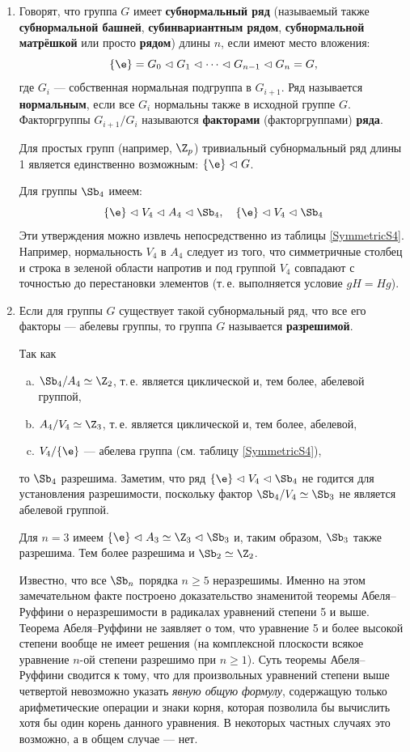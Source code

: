 \begin{enumerate}
\item Говорят, что группа $G$ имеет \textbf{субнормальный ряд} (называемый также \textbf{субнормальной башней}, \textbf{субинвариантным рядом}, \textbf{субнормальной матрёшкой} или просто \textbf{рядом}) длины $n$, если имеют место вложения:
$$
\{\e\}=G_0\vartriangleleft G_1\vartriangleleft\dots\vartriangleleft G_{n-1}\vartriangleleft G_n=G,
$$
где $G_i$ --- собственная нормальная подгруппа в $G_{i+1}$. Ряд называется \textbf{нормальным}, если все $G_i$ нормальны также в исходной группе $G$. Факторгруппы $G_{i+1}/G_i$ называются \textbf{факторами} (факторгруппами) \textbf{ряда}.

Для простых групп (например, $\Z_p$) тривиальный субнормальный ряд длины 1 является единственно возможным: $\{\e\}\vartriangleleft G$.

Для группы $\Sb_4$ имеем: 
$$
\{\e\}\vartriangleleft V_4\vartriangleleft A_4\vartriangleleft\Sb_4,\quad\{\e\}\vartriangleleft V_4\vartriangleleft\Sb_4
$$
Эти утверждения можно извлечь непосредственно из таблицы \ref{SymmetricS4}. Например, нормальность $V_4$ в $A_4$ следует из того, что симметричные столбец и строка в зеленой области напротив и под группой $V_4$ совпадают с точностью до перестановки элементов (т.\,е. выполняется условие $gH=Hg$).

\item Если для группы $G$ существует такой субнормальный ряд, что все его факторы --- абелевы группы, то группа $G$ называется \textbf{разрешимой}.

Так как
\begin{enumerate}[a)]
\item $\Sb_4/A_4\simeq\Z_2$, т.\,е. является циклической и, тем более, абелевой группой,
\item $A_4/V_4\simeq\Z_3$, т.\,е. является циклической и, тем более, абелевой,
\item $V_4/\{\e\}$ --- абелева группа (см. таблицу \ref{SymmetricS4}),
\end{enumerate}
то $\Sb_4$ разрешима. Заметим, что ряд $\{\e\}\vartriangleleft V_4\vartriangleleft\Sb_4$ не годится для установления разрешимости, поскольку фактор $\Sb_4/V_4\simeq\Sb_3$ не является абелевой группой.

Для $n=3$ имеем $\{\e\}\vartriangleleft A_3\simeq\Z_3\vartriangleleft\Sb_3$ и, таким образом, $\Sb_3$ также разрешима. Тем более разрешима и $\Sb_2\simeq\Z_2$.

Известно, что все $\Sb_n$ порядка $n\ge 5$ неразрешимы. Именно на этом замечательном факте построено доказательство знаменитой теоремы Абеля--Руффини о неразрешимости в радикалах уравнений степени 5 и выше. Теорема Абеля--Руффини не заявляет о том, что уравнение 5 и более высокой степени вообще не имеет решения (на комплексной плоскости всякое уравнение $n$-ой степени разрешимо при $n\ge 1$). Суть теоремы Абеля--Руффини сводится к тому, что для произвольных уравнений степени выше четвертой невозможно указать \textit{явную общую формулу}, содержащую только арифметические операции и знаки корня, которая позволила бы вычислить хотя бы один корень данного уравнения. В некоторых частных случаях это возможно, а в общем случае --- нет.



\end{enumerate}

